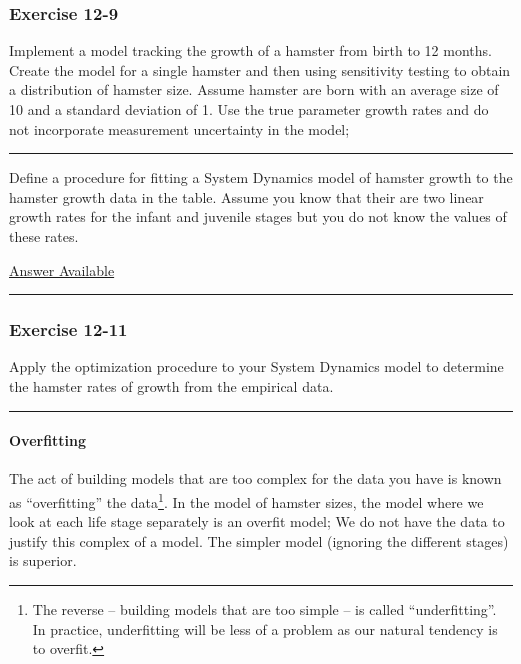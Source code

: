 \documentclass[]{memoir}
\begin{document}
\subsubsection{Exercise 12-9}

Implement a model tracking the growth of a hamster from birth to 12
months. Create the model for a single hamster and then using sensitivity
testing to obtain a distribution of hamster size. Assume hamster are
born with an average size of 10 and a standard deviation of 1. Use the
true parameter growth rates and do not incorporate measurement
uncertainty in the model;

\begin{center}\rule{3in}{0.4pt}\end{center}


Define a procedure for fitting a System Dynamics model of hamster growth
to the hamster growth data in the table. Assume you know that their are
two linear growth rates for the infant and juvenile stages but you do
not know the values of these rates.

\hyperref[Ans-12-10]{Answer Available}

\begin{center}\rule{3in}{0.4pt}\end{center}

\subsubsection{Exercise 12-11}

Apply the optimization procedure to your System Dynamics model to
determine the hamster rates of growth from the empirical data.

\begin{center}\rule{3in}{0.4pt}\end{center}

\paragraph{Overfitting}

The act of building models that are too complex for the data you have is
known as ``overfitting'' the data\footnote{The reverse -- building
  models that are too simple -- is called ``underfitting''. In practice,
  underfitting will be less of a problem as our natural tendency is to
  overfit.}. In the model of hamster sizes, the model where we look at
each life stage separately is an overfit model; We do not have the data
to justify this complex of a model. The simpler model (ignoring the
different stages) is superior.
\end{document}
